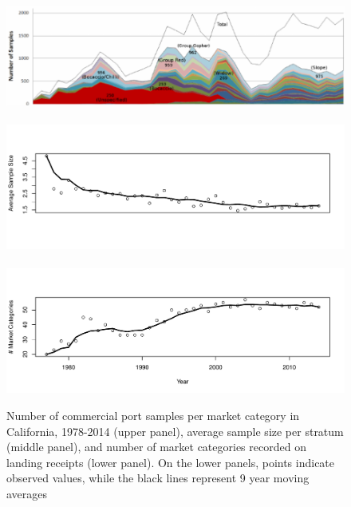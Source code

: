 \documentclass[12pt]{article}
\begin{document}
\begin{figure}[h!]
\centering
\includegraphics[width=\textwidth]{./pictures/mcatColors.png}
$~$\\
\vspace*{-2cm}
\hspace*{-0.3cm}
\includegraphics[width=1.055\textwidth]{./pictures/stratAvgSamp.pdf}
$~$\\
\vspace*{-3.8cm}
\hspace*{-0.3cm}
\includegraphics[width=1.055\textwidth]{./pictures/nMcatsEMA.pdf}
\caption{Number of commercial port samples per market
category in California, 1978-2014 (upper panel), average sample size per
stratum (middle panel), and number of market categories recorded on
landing receipts (lower panel). On the lower panels, points indicate
observed values, while the black lines represent 9 year moving averages}
\label{sparceData}
\end{figure}
\end{document}
